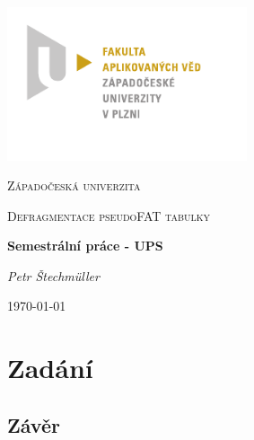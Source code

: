 \documentclass{report}
\begin{document}
\begin{titlepage}
		\includegraphics[width=267px]{img/fav_logo.pdf}\par\vspace{1cm}
		\centering
		{\scshape\LARGE Západočeská univerzita \par}
		\vspace{0.5cm}
		{\scshape\Large Defragmentace pseudoFAT tabulky\par}
		\vspace{2cm}
		{\Large\bfseries Semestrální práce - UPS \par}
		\vspace{0.5cm}
		{\Large\itshape Petr Štechmüller\par}
		\vfill
		{\large \today\par}
\end{titlepage}

\tableofcontents

\chapter*{Zadání}


\section*{Závěr}


\begin{thebibliography}{9}


\end{thebibliography}
\end{document}

